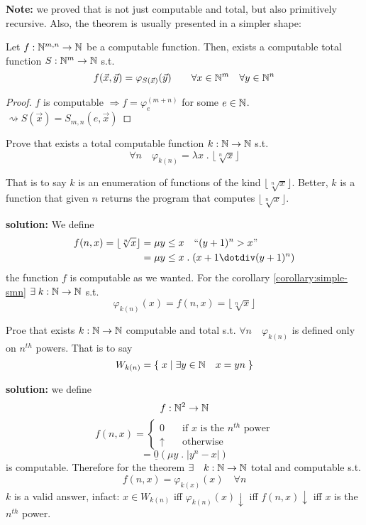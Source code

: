 \textbf{Note:} we proved that \smn is not just computable and total,
but also primitively recursive. Also, the theorem is usually presented
in a simpler shape:

\begin{corollary}\label{corollary:simple-smn}
  Let $f: \mathbb{N}^{m,n} \rightarrow \mathbb{N}$ be a computable function. Then,
  exists a computable total function $S: \mathbb{N}^m\rightarrow \mathbb{N}$ s.t.
  \[
    f(\vec{x}, \vec{y}) = \varphi_{S(\vec{x})}(\vec{y}) \quad \quad
    \forall x \in \mathbb{N}^m \quad \forall y \in \mathbb{N}^n
  \]
  \begin{proof}
    $f$ is computable $\Rightarrow f = \varphi_e^{(m+n)}$ for some
    $e \in \mathbb{N}$. $\rightsquigarrow S(\vec{x}) = S_{m,n}(e, \vec{x})$
  \end{proof}
\end{corollary}

\begin{exercise}
  Prove that exists a total computable function $k : \mathbb{N} \rightarrow \mathbb{N}$ s.t.
  \[
    \forall n \quad \varphi_{k(n)} = \lambda x \; . \; \lfloor \sqrt[n]{x} \rfloor
  \]

  That is to say $k$ is an enumeration of functions of the kind
  $\lfloor \sqrt[n]{x} \rfloor$. Better, $k$ is a function that given
  $n$ returns the program that computes $\lfloor \sqrt[n]{x}
  \rfloor$.

  \textbf{solution:} We define
  \[
    \begin{aligned}
      f(n,x) = \lfloor \sqrt[n]{x} \rfloor &= \mu y \leq x \quad \mbox{``}(y+1)^n > x\mbox{''} \\
      &= \mu y \leq x \; . \; (x+1 \dotdiv (y+1)^n)
    \end{aligned}
  \]
  the function $f$ is computable as we wanted. For the corollary
  \ref{corollary:simple-smn} $\exists \; k: \mathbb{N} \rightarrow \mathbb{N}$ s.t.
  \[
    \varphi_{k(n)}(x) = f(n,x) = \lfloor \sqrt[n]{x} \rfloor
  \]
\end{exercise}

\begin{exercise}
  Proe that exists $k : \mathbb{N} \rightarrow \mathbb{N}$ computable and total s.t.
  $\forall n \quad \varphi_{k(n)}$ is defined only on $n^{th}$
  powers. That is to say
  \[
    W_{k(n)} = \{ \; x \; | \; \exists y \in \mathbb{N} \quad x = yn \; \}
  \]

  \textbf{solution:} we define
  \[
    f : \mathbb{N}^2 \rightarrow \mathbb{N}
  \]
  \[
    f(n,x) = \begin{cases}
      0 & \quad \mbox{if } x \mbox{ is the } n^{th} \mbox{ power} \\
      \uparrow &\quad \mbox{otherwise}
    \end{cases}
  \]
  \[
    = \underline{0} (\mu y \; . \; |y^n-x|)
  \]
  is computable. Therefore for the \smn theorem
  $\exists \quad k : \mathbb{N} \rightarrow \mathbb{N}$ total and computable s.t.
  \[
    f(n,x) = \varphi_{k(x)}(x) \quad \forall n
  \]
  $k$ is a valid answer, infact: $x \in W_{k(n)}$ iff
  $\varphi_{k(n)}(x)\downarrow$ iff $f(n,x)\downarrow$ iff $x$ is the
  $n^{th}$ power.
\end{exercise}

